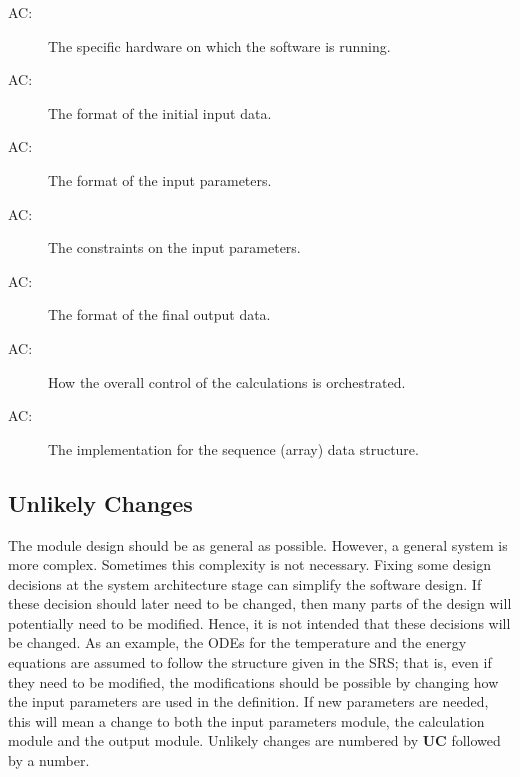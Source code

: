 \documentclass[12pt]{article}
\newcounter{acnum}
\newcommand{\actheacnum}{AC\theacnum}
\begin{document}
\begin{description}
\item[ \actheacnum \label{acHardware}:] The specific
  hardware on which the software is running.
\item[ \actheacnum \label{acInput}:] The format of the
  initial input data.
\item[ \actheacnum \label{acParams}:] The format of the
  input parameters.
\item[ \actheacnum \label{acVerify}:] The constraints on
  the input parameters.
\item[ \actheacnum \label{acOutput}:] The format of the
  final output data.
\item[ \actheacnum \label{acControl}:] How the overall
  control of the calculations is orchestrated.
\item[ \actheacnum \label{acSeqDS}:] The implementation
  for the sequence (array) data structure.
\end{description}

\subsection{Unlikely Changes} \label{SecUchange}

The module design should be as general as possible. However, a general system is
more complex. Sometimes this complexity is not necessary. Fixing some design
decisions at the system architecture stage can simplify the software design. If
these decision should later need to be changed, then many parts of the design
will potentially need to be modified. Hence, it is not intended that these
decisions will be changed.  As an example, the ODEs for the temperature and the
energy equations are assumed to follow the structure given in the SRS; that is,
even if they need to be modified, the modifications should be possible by
changing how the input parameters are used in the definition.  If new parameters
are needed, this will mean a change to both the input parameters module, the
calculation module and the output module. Unlikely changes are numbered by \textbf{UC} 
followed by a number.
\end{document}
